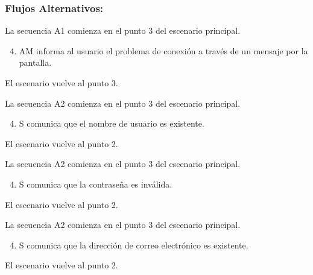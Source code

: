 \begin{framed}
\begin{enumerate}
\end{enumerate}

\subsubsection{Flujos Alternativos: }

La secuencia A1 comienza en el punto 3 del escenario principal. 
\begin{enumerate}
    \setcounter{enumi}{3}
    \item AM informa al usuario el problema de conexión a través de un mensaje por la pantalla.
\end{enumerate}
El escenario vuelve al punto 3. 


La secuencia A2 comienza en el punto 3 del escenario principal.
\begin{enumerate}
    \setcounter{enumi}{3}
        \item S comunica que el nombre de usuario es existente.
\end{enumerate}
El escenario vuelve al punto 2. 


La secuencia A2 comienza en el punto 3 del escenario principal. 
\begin{enumerate}
    \setcounter{enumi}{3}
    \item S comunica que la contraseña es inválida. 
\end{enumerate}
El escenario vuelve al punto 2. 

La secuencia A2 comienza en el punto 3 del escenario principal. 
\begin{enumerate}
    \setcounter{enumi}{3}
    \item S comunica que la dirección de correo electrónico es existente. 
\end{enumerate}
El escenario vuelve al punto 2. 

\end{framed}


